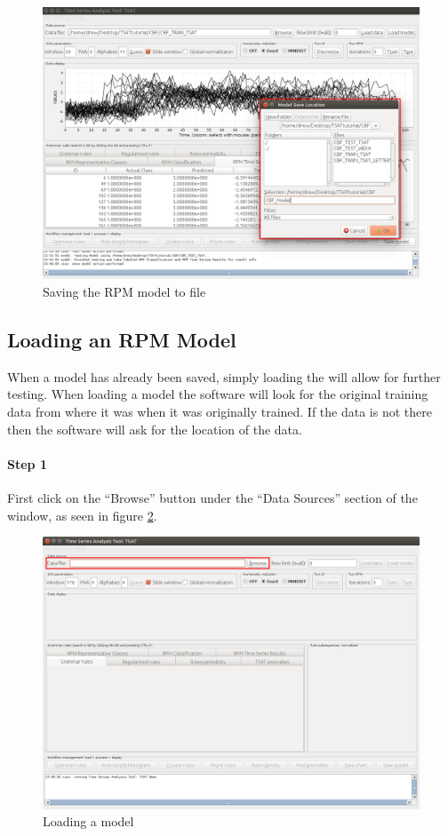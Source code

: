 \documentclass[titlepage, letterpaper, 12pt]{article}
\begin{document}
\begin{figure}[H]
	\includegraphics[width=\textwidth]{TSAT-save-model-step-2}
	\caption{Saving the RPM model to file}
	\label{fig:TSAT-save-model-step-2}
\end{figure}

\newpage
\subsection{Loading an RPM Model}
\label{RPMLoading}
When a model has already been saved, simply loading the will allow for further testing. When loading a model the software will look for the original training data from where it was when it was originally trained. If the data is not there then the software will ask for the location of the data.

\paragraph{Step 1}
First click on the ``Browse'' button under the ``Data Sources'' section of the window, as seen in figure \ref{fig:TSAT-load-model-step-1}. 

\begin{figure}[h]
	\includegraphics[width=\textwidth]{TSAT-load-model-step-1}
	\caption{Loading a model}
	\label{fig:TSAT-load-model-step-1}
\end{figure}
\end{document}
